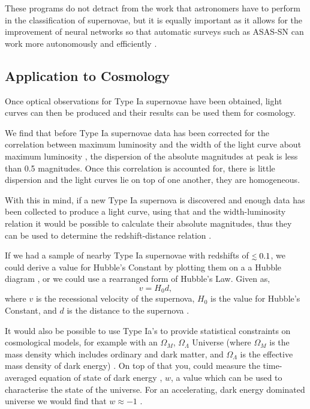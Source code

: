 \documentclass[twocolumn]{revtex4}
\begin{document}
These programs do not detract from the work that astronomers have to perform in the classification of supernovae, but it is equally important as it allows for the improvement of neural networks so that automatic surveys such as ASAS-SN can work more autonomously and efficiently \cite{cit-sci}.  


\vspace{-3ex}
\subsection{Application to Cosmology} \label{appcosmo}
\vspace{-2ex}
Once optical observations for Type Ia supernovae have been obtained, light curves can then be produced and their results can be used them for cosmology. 

We find that before Type Ia supernovae data has been corrected for the correlation between maximum luminosity and the width of the light curve about maximum luminosity \cite{longair, abs_phil}, the dispersion of the absolute magnitudes at peak is less than 0.5 magnitudes. Once this correlation is accounted for, there is little dispersion and the light curves lie on top of one another, they are homogeneous. 

With this in mind, if a new Type Ia supernova is discovered and enough data has been collected to produce a light curve, using that and the width-luminosity relation it would be possible to calculate their absolute magnitudes, thus they can be used to determine the redshift-distance relation \cite{mod_ast}.

If we had a sample of nearby Type Ia supernovae with redshifts of $\mathrel{\mathsmaller{\lesssim}} 0.1$, we could derive a value for Hubble's Constant by plotting them on a a Hubble diagram \cite{exp_uni_sn}, or we could use a rearranged form of Hubble's Law. Given as,
\begin{equation}
v = H_0 d, 
\label{h_nought}
\end{equation}
where $v$ is the recessional velocity of the supernova, $H_0$ is the value for Hubble's Constant, and $d$ is the distance to the supernova \cite{mod_ast}. 

It would also be possible to use Type Ia's to provide statistical constraints on cosmological models, for example with an $\Omega_M$, $\Omega_{\Lambda}$ Universe (where $\Omega_M$ is the mass density which includes ordinary and dark matter, and $\Omega_{\Lambda}$ is the effective mass density of dark energy) \cite{mod_ast, exp_uni_sn}. On top of that you, could measure the time-averaged equation of state of dark energy \cite{sn_consts}, $w$, a value which can be used to characterise the state of the universe. For an accelerating, dark energy dominated universe we would find that $w \approx -1$ \cite{longair}. 
\end{document}
